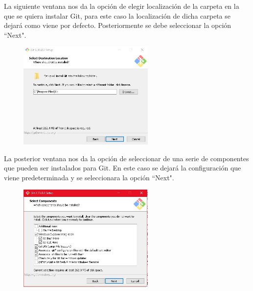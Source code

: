 \documentclass[10pt,a4paper]{article} %
\begin{document}
\begin{enumerate}
{			\pagebreak
			\item La siguiente ventana nos da la opci{\' o}n de elegir localizaci{\' o}n de la carpeta en la que se quiera instalar Git, para este caso la localizaci{\' o}n de dicha carpeta se dejar{\' a} como viene por defecto. Posteriormente se debe seleccionar la opci{\' o}n ``Next".
			\begin{figure}[H]
				\includegraphics[width=0.6\textwidth]{5.jpg}
				\centering
				\label{img:paso5}
			\end{figure}
			\item La posterior ventana nos da la opci{\' o}n de seleccionar de una serie de componentes que pueden ser instalados para Git. En este caso se dejar{\' a} la configuraci{\' o}n que viene predeterminada y se seleccionara la opci{\' o}n ``Next".
			\begin{figure}[H]
				\includegraphics[width=0.6\textwidth]{6.jpg}
				\centering
				\label{img:paso6}
			\end{figure}
			
}
\end{enumerate}
\end{document}

